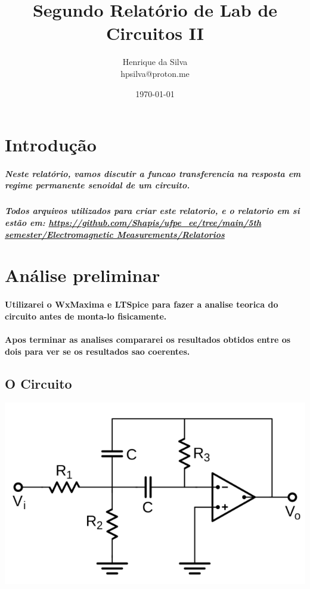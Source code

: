 \documentclass[12pt,twoside, a4paper, twocolumn]{article}
\title{Segundo Relatório de Lab de Circuitos II}
\author{Henrique da Silva \\ hpsilva@proton.me}
\date{\today}
\begin{document}
\maketitle
{}
\newpage
\tableofcontents
\newpage



\section{Introdução}


\subparagraph*{Neste relatório, vamos discutir a funcao transferencia na resposta em regime permanente senoidal de um circuito.}

\subparagraph*{Todos arquivos utilizados para criar este relatorio, e o relatorio em si estão em:  \url{https://github.com/Shapis/ufpe_ee/tree/main/5th semester/Electromagnetic Measurements/Relatorios}}




\section{Análise preliminar}

\paragraph*{Utilizarei o WxMaxima e LTSpice para fazer a analise teorica do circuito antes de monta-lo fisicamente.}

\paragraph*{Apos terminar as analises compararei os resultados obtidos entre os dois para ver se os resultados sao coerentes.}

\subsection{O Circuito}
\begin{adjustbox}{scale=0.30}
    \includegraphics{AnaliseNodal.png}
\end{adjustbox}
\newpage
\end{document}
